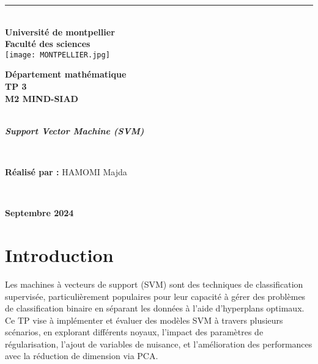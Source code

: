 \documentclass[12pt,a4paper]{report}
\begin{document}
\begin{center}
\thispagestyle{empty}
\rule{1\textwidth}{0,5pt}\vspace{0,5cm}\\
\textbf{Université de montpellier\\
Faculté des sciences}\\
\vspace{1cm}
\texttt{[image: MONTPELLIER.jpg]}
\end{center}

\begin{center}
\textbf{Département mathématique}
\vspace{1cm}
\hspace{2cm}\\
\textbf{\huge{TP 3}} \\
\vspace{1cm}
\textbf{M2 MIND-SIAD}
\vspace{1cm}

\rule{0,9\textwidth}{3pt}\\
\vspace{0,3cm}
\large\textit{\textbf{ Support Vector Machine (SVM)}}
\normalsize
\rule{0,9\textwidth}{3pt}\\ 
 
\end{center}
\vspace{1cm}
\hspace{0,2cm}
\begin{center}
\textbf{Réalisé par :}
\hspace*{0,3cm}HAMOMI Majda
\end{center}



\\
\vspace{1cm}
\begin{center}
\textbf{Septembre 2024 }
\end{center}
\pagestyle{plain}




\tableofcontents
\newpage

\section*{Introduction  }
Les machines à vecteurs de support (SVM) sont des techniques de classification supervisée, particulièrement populaires pour leur capacité à gérer des problèmes de classification binaire en séparant les données à l'aide d'hyperplans optimaux. Ce TP vise à implémenter et évaluer des modèles SVM à travers plusieurs scénarios, en explorant différents noyaux, l'impact des paramètres de régularisation, l'ajout de variables de nuisance, et l'amélioration des performances avec la réduction de dimension via PCA.
\end{document}
